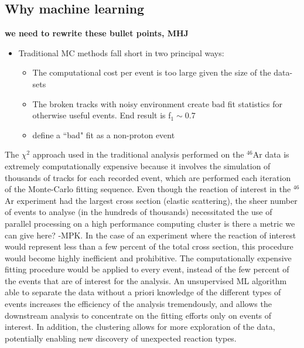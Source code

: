 \documentclass[review,number,sort&compress]{elsarticle}
\begin{document}
\subsection{Why machine learning}
{\bf we need to rewrite these bullet points, MHJ}
\begin{itemize}
    \item Traditional MC methods fall short in two principal ways:
    \begin{itemize}
        \item The computational cost per event is too large given the size of the data-sets
        \item The broken tracks with noisy environment create bad fit statistics for otherwise useful events. End result is f$_1 \sim 0.7 $
        \item define a ``bad" fit as a non-proton event
    \end{itemize}
\end{itemize}

The $\chi^2$ approach used in the traditional analysis performed on the $^{46}$Ar data is extremely computationally expensive because it involves the simulation of thousands of tracks for each recorded event, which are performed each iteration of the Monte-Carlo fitting sequence. Even though the reaction of interest in the $^{46}$Ar experiment had the largest cross section (elastic scattering), the sheer number of events to analyse (in the hundreds of thousands) necessitated the use of parallel processing on a high performance computing cluster {\color{blue} is there a metric we can give here? -MPK}. In the case of an experiment where the reaction of interest would represent less than a few percent of the total cross section, this procedure would become highly inefficient and prohibitive. 
The computationally expensive fitting procedure would be applied to every event, instead of the few percent of the events that are of interest for the analysis.
An unsupervised ML algorithm able to separate the data without a priori knowledge of the different types of events increases the efficiency of the analysis tremendously, and allows the downstream analysis to concentrate on the fitting efforts only on events of interest. In addition, the clustering allows for more exploration of the data, potentially enabling new discovery of unexpected reaction types.

\end{document}
